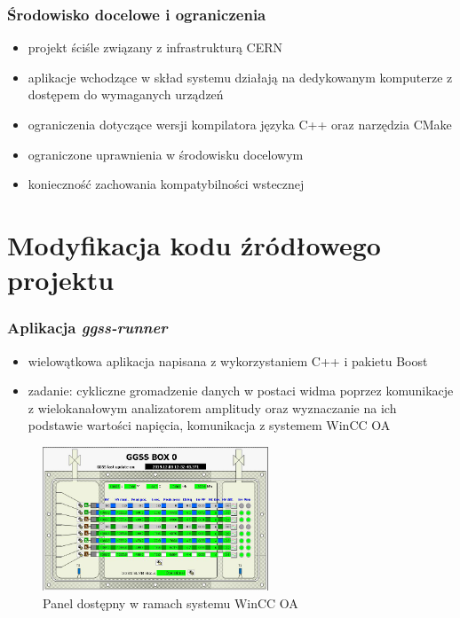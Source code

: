 \documentclass[10pt]{beamer}
\begin{document}
\begin{frame}
\frametitle{Środowisko docelowe i ograniczenia}
\begin{itemize}
    \item projekt ściśle związany z infrastrukturą CERN
    \item aplikacje wchodzące w skład systemu działają na dedykowanym komputerze z dostępem do wymaganych urządzeń
    \item ograniczenia dotyczące wersji kompilatora języka C++ oraz narzędzia CMake
    \item ograniczone uprawnienia w środowisku docelowym
    \item konieczność zachowania kompatybilności wstecznej
\end{itemize}
\end{frame}

\section{Modyfikacja kodu źródłowego projektu}

\begin{frame}
\frametitle{Aplikacja \emph{ggss-runner}}
\begin{itemize}
    \item wielowątkowa aplikacja napisana z wykorzystaniem C++ i pakietu Boost
    \item zadanie: cykliczne gromadzenie danych w postaci widma poprzez komunikacje z wielokanałowym analizatorem amplitudy oraz wyznaczanie na ich podstawie wartości napięcia, komunikacja z systemem WinCC OA
\end{itemize}
\begin{figure}
\includegraphics[width=0.6\textwidth]{static/winccoa_panel.png}
\caption{Panel dostępny w ramach systemu WinCC OA}
\end{figure}
\end{frame}
\end{document}
